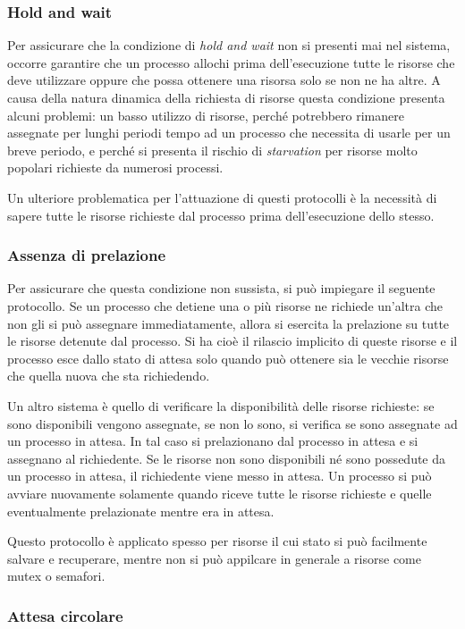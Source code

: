 \documentclass[a4paper,12pt, twoside]{report}
\begin{document}
\subsubsection{Hold and wait}
Per assicurare che la condizione di \emph{hold and wait} non si presenti mai nel sistema, occorre garantire che un
processo allochi prima dell'esecuzione tutte le risorse che deve utilizzare oppure che possa ottenere una risorsa solo se
non ne ha altre. A causa della natura dinamica della richiesta di risorse questa condizione presenta alcuni problemi: un
basso utilizzo di risorse, perch\'e potrebbero rimanere assegnate per lunghi periodi tempo ad un processo che necessita
di usarle per un breve periodo, e perch\'e si presenta il rischio di \emph{starvation} per risorse molto popolari richieste
da numerosi processi.

Un ulteriore problematica per l'attuazione di questi protocolli \`e la necessit\`a di sapere tutte le risorse richieste
dal processo prima dell'esecuzione dello stesso.

\subsubsection{Assenza di prelazione}
Per assicurare che questa condizione non sussista, si pu\`o impiegare il seguente protocollo. Se un processo che detiene
una o pi\`u risorse ne richiede un'altra che non gli si pu\`o assegnare immediatamente, allora si esercita la prelazione
su tutte le risorse detenute dal processo. Si ha cio\`e il rilascio implicito di queste risorse e il processo esce dallo
stato di attesa solo quando pu\`o ottenere sia le vecchie risorse che quella nuova che sta richiedendo.

Un altro sistema \`e quello di verificare la disponibilit\`a delle risorse richieste: se sono disponibili vengono assegnate,
se non lo sono, si verifica se sono assegnate ad un processo in attesa. In tal caso si prelazionano dal processo in attesa
e si assegnano al richiedente. Se le risorse non sono disponibili n\'e sono possedute da un processo in attesa, il
richiedente viene messo in attesa. Un processo si pu\`o avviare nuovamente solamente quando riceve tutte le risorse
richieste e quelle eventualmente prelazionate mentre era in attesa.

Questo protocollo \`e applicato spesso per risorse il cui stato si pu\`o facilmente salvare e recuperare, mentre non si
pu\`o appilcare in generale a risorse come mutex o semafori.

\subsubsection{Attesa circolare}
\end{document}
